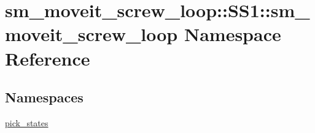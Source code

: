 \hypertarget{namespacesm__moveit__screw__loop_1_1SS1_1_1sm__moveit__screw__loop}{}\section{sm\+\_\+moveit\+\_\+screw\+\_\+loop\+:\+:S\+S1\+:\+:sm\+\_\+moveit\+\_\+screw\+\_\+loop Namespace Reference}
\label{namespacesm__moveit__screw__loop_1_1SS1_1_1sm__moveit__screw__loop}
\subsection*{Namespaces}
\begin{DoxyCompactItemize}
\item 
 \hyperlink{namespacesm__moveit__screw__loop_1_1SS1_1_1sm__moveit__screw__loop_1_1pick__states}{pick\+\_\+states}
\end{DoxyCompactItemize}
